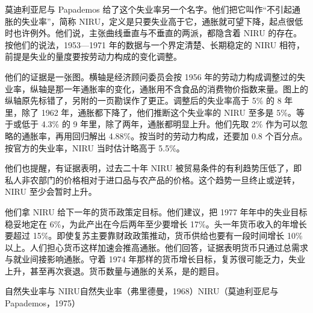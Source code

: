 莫迪利亚尼与 Papademos 给了这个失业率另一个名字。他们把它叫作“不引起通胀的失业率”，简称 NIRU，定义是只要失业高于它，通胀就可望下降，起点很低时也许例外\cite{modigliani1975}。他们说，主张曲线垂直与不垂直的两派，都隐含着 NIRU 的存在\cite{modigliani1975}。按他们的说法，1953—1971 年的数据与一个界定清楚、长期稳定的 NIRU 相符，前提是失业的量度要按劳动力构成的变化调整\cite{modigliani1975}。

他们的证据是一张图\cite{modigliani1975}。横轴是经济顾问委员会按 1956 年的劳动力构成调整过的失业率，纵轴是那一年通胀率的变化，通胀用不含食品的消费物价指数来量\cite{modigliani1975}。图上的纵轴原先标错了，另附的一页勘误作了更正\cite{modigliani1975}。调整后的失业率高于 5\% 的 8 年里，除了 1962 年，通胀都下降了，他们推断这个失业率的 NIRU 至多是 5\%\cite{modigliani1975}。等于或低于 4.3\% 的 9 年里，除了两年，通胀都明显上升\cite{modigliani1975}。他们先取 2\% 作为可以忽略的通胀率，再用回归解出 4.88\%\cite{modigliani1975}。按当时的劳动力构成，还要加 0.8 个百分点\cite{modigliani1975}。按官方的失业率，NIRU 当时估计略高于 5.5\%\cite{modigliani1975}。

他们也提醒，有证据表明，过去二十年 NIRU 被贸易条件的有利趋势压低了，即私人非农部门的价格相对于进口品与农产品的价格\cite{modigliani1975}。这个趋势一旦终止或逆转，NIRU 至少会暂时上升\cite{modigliani1975}。

他们拿 NIRU 给下一年的货币政策定目标\cite{modigliani1975}。他们建议，把 1977 年年中的失业目标稳妥地定在 6\%，为此产出在今后两年至少要增长 17\%\cite{modigliani1975}。头一年货币收入的年增长要超过 15\%\cite{modigliani1975}。即使复苏主要靠财政政策推动，货币供给也要有一段时间增长 10\% 以上\cite{modigliani1975}。人们担心货币这样加速会推高通胀\cite{modigliani1975}。他们回答，证据表明货币只通过总需求与就业间接影响通胀\cite{modigliani1975}。守着 1974 年那样的货币增长目标，复苏很可能乏力，失业上升，甚至再次衰退\cite{modigliani1975}。货币数量与通胀的关系，是的题目。

\begin{compare}{自然失业率与 NIRU}{自然失业率（弗里德曼，1968）}{NIRU（莫迪利亚尼与 Papademos，1975）}
\end{compare}

